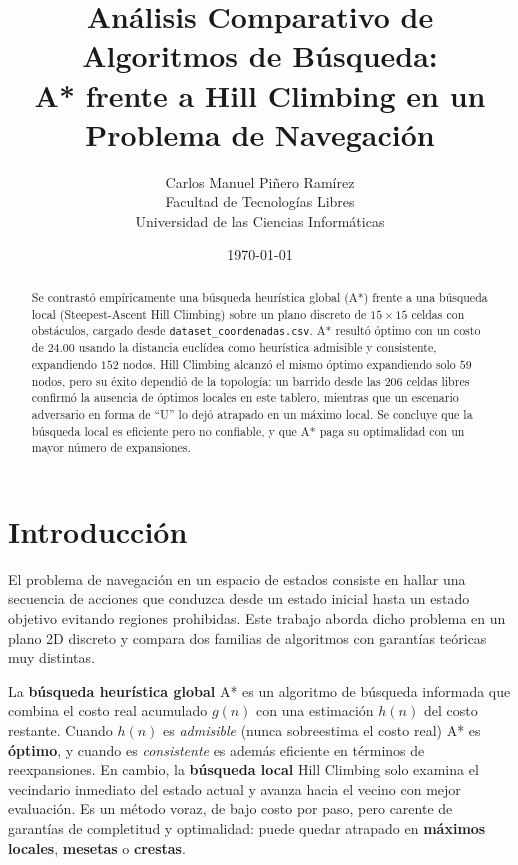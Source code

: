 \documentclass[12pt,a4paper]{article}
\title{\textbf{An\'alisis Comparativo de Algoritmos de B\'usqueda:\\ A* frente a Hill Climbing en un Problema de Navegaci\'on}}
\author{Carlos Manuel Pi\~nero Ram\'irez \\ Facultad de Tecnolog\'ias Libres \\ Universidad de las Ciencias Inform\'aticas}
\date{\today}
\newcommand{\code}[1]{\texttt{#1}}
\begin{document}
\maketitle

\begin{abstract}
\noindent
Se contrast\'o emp\'iricamente una b\'usqueda heur\'istica global (A*) frente a una b\'usqueda
local (Steepest-Ascent Hill Climbing) sobre un plano discreto de $15\times15$ celdas con
obst\'aculos, cargado desde \code{dataset\_coordenadas.csv}. A* result\'o \'optimo con un
costo de $24.00$ usando la distancia eucl\'idea como heur\'istica admisible y consistente,
expandiendo $152$ nodos. Hill Climbing alcanz\'o el mismo \'optimo expandiendo solo $59$
nodos, pero su \'exito dependi\'o de la topolog\'ia: un barrido desde las $206$ celdas
libres confirm\'o la ausencia de \'optimos locales en este tablero, mientras que un
escenario adversario en forma de ``U'' lo dej\'o atrapado en un m\'aximo local. Se concluye
que la b\'usqueda local es eficiente pero no confiable, y que A* paga su optimalidad con un
mayor n\'umero de expansiones.
\end{abstract}

\section{Introducci\'on}
\label{sec:intro}

El problema de navegaci\'on en un espacio de estados consiste en hallar una secuencia de
acciones que conduzca desde un estado inicial hasta un estado objetivo evitando regiones
prohibidas. Este trabajo aborda dicho problema en un plano 2D discreto y compara dos
familias de algoritmos con garant\'ias te\'oricas muy distintas.

La \textbf{b\'usqueda heur\'istica global} A* \cite{russell2020} es un algoritmo de
b\'usqueda informada que combina el costo real acumulado $g(n)$ con una estimaci\'on
$h(n)$ del costo restante. Cuando $h(n)$ es \emph{admisible} (nunca sobreestima el costo
real) A* es \textbf{\'optimo}, y cuando es \emph{consistente} es adem\'as eficiente en
t\'erminos de reexpansiones. En cambio, la \textbf{b\'usqueda local} Hill Climbing
\cite{russell2020} solo examina el vecindario inmediato del estado actual y avanza hacia
el vecino con mejor evaluaci\'on. Es un m\'etodo voraz, de bajo costo por paso, pero
carente de garant\'ias de completitud y optimalidad: puede quedar atrapado en
\textbf{m\'aximos locales}, \textbf{mesetas} o \textbf{crestas}.
\end{document}
